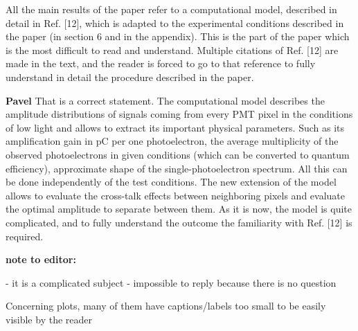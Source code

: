 \documentclass[11pt]{report}
\begin{document}
\begin{tcolorbox}[enlarge top by=2em,colbacktitle=red!60!white,colframe=black!80!white,left=0pt,right=0pt,top=0pt,bottom=0pt,boxrule=0.3pt,title=\bfseries2.05]
All the main results of the paper refer to a computational model, described in detail in Ref. [12], which is adapted to the experimental conditions described in the paper (in section 6 and in the appendix). This is the part of the paper which is the most difficult to read and understand. Multiple citations of Ref. [12] are made in the text, and the reader is forced to go to that reference to fully understand in detail the procedure described in the paper.
\end{tcolorbox}

{\centering
\begin{tcolorbox}[enlarge top by=2em,colbacktitle=green!60!white,colframe=black!80!white,width=0.9\linewidth,left=30pt,right=30pt,top=10pt,bottom=10pt,boxrule=0.3pt,title=\bfseries our draft remarks]
{\bfseries Pavel}
That is a correct statement. The computational model describes the amplitude distributions of signals coming from every PMT pixel in the conditions of low light and allows to extract its important physical parameters. Such as its amplification gain in pC per one photoelectron, the average multiplicity of the observed photoelectrons in given conditions (which can be converted to quantum efficiency), approximate shape of the single-photoelectron spectrum. All this can be done independently of the test conditions. The new extension of the model allows to evaluate the cross-talk effects between neighboring pixels and evaluate the optimal amplitude to separate between them. As it is now, the model is quite complicated, and to fully understand the outcome the familiarity with Ref. [12] is required. 

{\bfseries note to editor:}

- it is a complicated subject
- impossible to reply because there is no question
\end{tcolorbox}
}



\begin{tcolorbox}[enlarge top by=2em,colbacktitle=blue!60!white,colframe=black!80!white,left=0pt,right=0pt,top=0pt,bottom=0pt,boxrule=0.3pt,title=\bfseries2.06]
Concerning plots, many of them have captions/labels too small to be easily visible by the reader
\end{tcolorbox}
\end{document}
